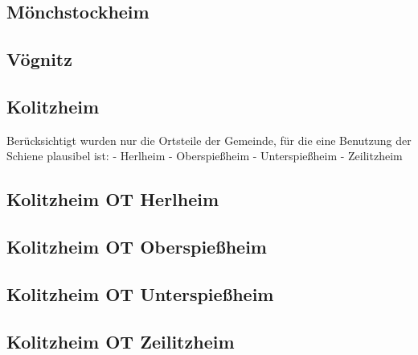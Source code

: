 \documentclass[fontsize=12pt,a4paper]{scrreprt}
\begin{document}
                \subsection{Mönchstockheim}
                
                
                \subsection{Vögnitz}
                
                
                \subsection{Kolitzheim}
                Berücksichtigt wurden nur die Ortsteile der Gemeinde, für die eine Benutzung der Schiene plausibel ist:\newline
                - Herlheim\newline
                - Oberspießheim\newline
                - Unterspießheim\newline
                - Zeilitzheim
                
                \subsection{Kolitzheim OT Herlheim}
                
                
                \subsection{Kolitzheim OT Oberspießheim}
                
                
                \subsection{Kolitzheim OT Unterspießheim}
                
                
                \subsection{Kolitzheim OT Zeilitzheim}
                
                
\end{document}
